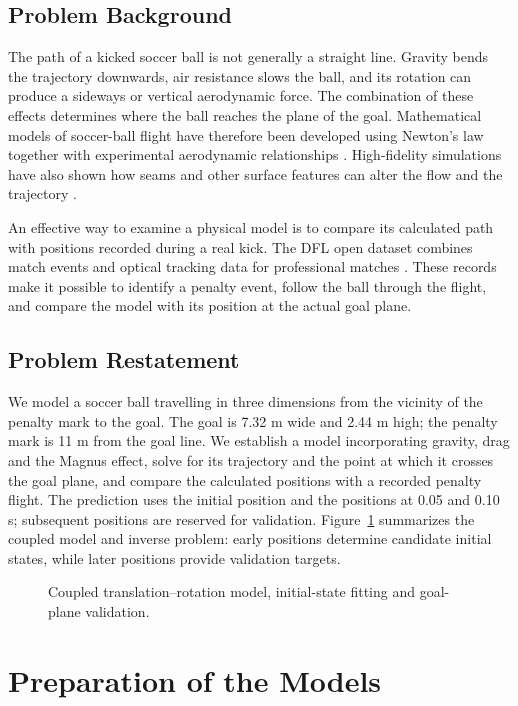 \documentclass[12pt,letterpaper]{article}
\begin{document}
\subsection{Problem Background}
The path of a kicked soccer ball is not generally a straight line. Gravity bends the trajectory downwards, air resistance slows the ball, and its rotation can produce a sideways or vertical aerodynamic force. The combination of these effects determines where the ball reaches the plane of the goal. Mathematical models of soccer-ball flight have therefore been developed using Newton's law together with experimental aerodynamic relationships \cite{bray,maponi,kiratidis2018}. High-fidelity simulations have also shown how seams and other surface features can alter the flow and the trajectory \cite{paudel}.

An effective way to examine a physical model is to compare its calculated path with positions recorded during a real kick. The DFL open dataset combines match events and optical tracking data for professional matches \cite{bassek,dataset}. These records make it possible to identify a penalty event, follow the ball through the flight, and compare the model with its position at the actual goal plane.

\subsection{Problem Restatement}
We model a soccer ball travelling in three dimensions from the vicinity of the penalty mark to the goal. The goal is 7.32 m wide and 2.44 m high; the penalty mark is 11 m from the goal line. We establish a model incorporating gravity, drag and the Magnus effect, solve for its trajectory and the point at which it crosses the goal plane, and compare the calculated positions with a recorded penalty flight. The prediction uses the initial position and the positions at 0.05 and 0.10 s; subsequent positions are reserved for validation. Figure~\ref{fig:workflow} summarizes the coupled model and inverse problem: early positions determine candidate initial states, while later positions provide validation targets.
\begin{figure}[H]\centering
\resizebox{\textwidth}{!}{}
\caption{Coupled translation--rotation model, initial-state fitting and goal-plane validation.}\label{fig:workflow}
\end{figure}

\section{Preparation of the Models}
\end{document}
